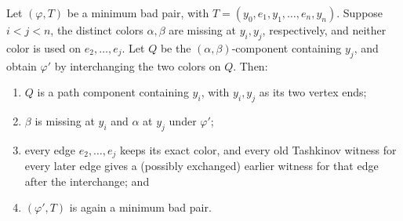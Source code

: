 \begin{lemma}
Let \((\varphi,T)\) be a minimum bad pair, with
\(T=(y_0,e_1,y_1,\ldots,e_n,y_n)\).  Suppose \(i<j<n\), the distinct
colors \(\alpha,\beta\) are missing at \(y_i,y_j\), respectively, and
neither color is used on \(e_2,\ldots,e_j\).  Let \(Q\) be the
\((\alpha,\beta)\)-component containing \(y_j\), and obtain
\(\varphi'\) by interchanging the two colors on \(Q\).  Then:
\begin{enumerate}
\item \(Q\) is a path component containing \(y_i\), with \(y_i,y_j\) as
its two vertex ends;
\item \(\beta\) is missing at \(y_i\) and \(\alpha\) at \(y_j\) under
\(\varphi'\);
\item every edge \(e_2,\ldots,e_j\) keeps its exact color, and every old
Tashkinov witness for every later edge gives a (possibly exchanged)
earlier witness for that edge after the interchange; and
\item \((\varphi',T)\) is again a minimum bad pair.
\end{enumerate}
\end{lemma}

